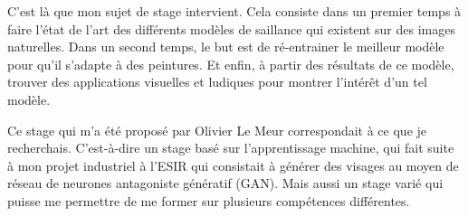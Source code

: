 \par
C'est là que mon sujet de stage intervient. Cela consiste dans un premier temps à faire l'état de l'art des différents modèles de saillance qui existent sur des images naturelles. Dans un second temps, le but est de ré-entrainer le meilleur modèle pour qu'il s'adapte à des peintures. Et enfin, à partir des résultats de ce modèle, trouver des applications visuelles et ludiques pour montrer l'intérêt d'un tel modèle.

\par 
Ce stage qui m'a été proposé par Olivier Le Meur correspondait à ce que je recherchais. C'est-à-dire un stage basé sur l'apprentissage machine, qui fait suite à mon projet industriel à l'ESIR qui consistait à générer des visages au moyen de réseau de neurones antagoniste génératif (GAN). Mais aussi un stage varié qui puisse me permettre de me former sur plusieurs compétences différentes.
